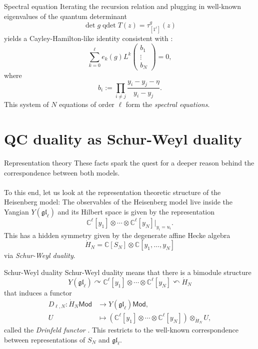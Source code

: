\documentclass[11pt]{beamer}
\theoremstyle{remark}
\theoremstyle{remark}
\newcommand{\C}{\mathbb{C}}
\begin{document}
\begin{frame}{Spectral equation}
Iterating the recursion relation and plugging in well-known eigenvalues of the quantum determinant
\begin{equation*}
\det g \operatorname{qdet} T(z) = \tau_{[1^\ell]}^g(z)
\end{equation*}
yields a Cayley-Hamilton-like identity consistent with \cite{article:gorsky:2014}:
\begin{equation*}
\sum_{k=0}^\ell e_k(g) L^k
\begin{pmatrix}
b_1 \\ \vdots \\ b_N
\end{pmatrix}
= 0,
\end{equation*}
where
\begin{equation*}
b_i := \prod_{i \neq j} \frac{y_i-y_j-\eta}{y_i-y_j}.
\end{equation*}
This system of $N$ equations of order $\ell$ form the \emph{spectral equations}.
\end{frame}

\section{QC duality as Schur-Weyl duality}

\begin{frame}{Representation theory}
These facts spark the quest for a deeper reason behind the correspondence between both models.
\\~\\
To this end, let us look at the representation theoretic structure of the Heisenberg model: The observables of the Heisenberg model live inside the Yangian $Y(\mathfrak{gl}_\ell)$ and its Hilbert space is given by the representation
\begin{equation*}
\C^\ell[y_1] \otimes \cdots \otimes \C^\ell[y_N]|_{y_i=u_i}.
\end{equation*}
This has a hidden symmetry given by the degenerate affine Hecke algebra
\begin{equation*}
\dot H_N = \C[S_N] \otimes \C[y_1,...,y_N]
\end{equation*}
via \emph{Schur-Weyl duality}.
\end{frame}

\begin{frame}{Schur-Weyl duality}
Schur-Weyl duality means that there is a bimodule structure
\begin{equation*}
Y(\mathfrak{gl}_\ell) \curvearrowright \C^\ell[y_1] \otimes \cdots \otimes \C^\ell[y_N] \curvearrowleft \dot H_N
\end{equation*}
that induces a functor
\begin{align*}
D_{\ell,N}: \dot H_N\mathsf{Mod} &\to Y(\mathfrak{gl}_\ell)\mathsf{Mod}, \\
U &\mapsto  (\C^\ell[y_1] \otimes \cdots \otimes \C^\ell[y_N]) \otimes_{\dot H_N} U,
\end{align*}
called the \emph{Drinfeld functor} \cite{article:drinfeld:1986}. This restricts to the well-known correspondence between representations of $S_N$ and $\mathfrak{gl}_\ell$.
\end{frame}
\end{document}
